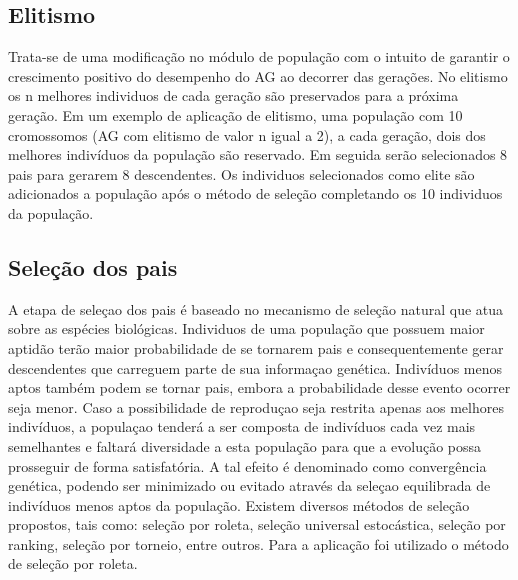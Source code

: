 \documentclass[twoside]{article}
\begin{document}
\begin{multicols}{2}
\subsection{Elitismo}
Trata-se de uma modificação no módulo de população com o intuito de garantir o crescimento positivo do desempenho do AG ao decorrer das gerações. No elitismo os n melhores individuos de cada geração são preservados para a próxima geração.  Em um exemplo de aplicação de elitismo, uma população com 10 cromossomos (AG com elitismo de valor n igual a 2), a cada geração, dois dos melhores indivíduos da população são reservado. Em seguida serão selecionados 8 pais para gerarem 8 descendentes. Os individuos selecionados como elite são adicionados a população após o método de seleção completando os 10 individuos da população.

\subsection{Seleção dos pais}
A etapa de seleçao dos pais é baseado no mecanismo de seleção natural que atua sobre as espécies biológicas. Individuos de uma população que possuem maior aptidão terão maior probabilidade de se tornarem pais e consequentemente gerar descendentes que carreguem parte de sua informaçao genética. Indivíduos menos aptos também podem se tornar pais, embora a probabilidade desse evento ocorrer seja menor. Caso a possibilidade de reproduçao seja restrita apenas aos melhores indivíduos, a populaçao tenderá a ser composta de indivíduos cada vez mais semelhantes e faltará diversidade a esta população para que a evolução possa prosseguir de forma satisfatória. A tal efeito é denominado como convergência genética, podendo ser minimizado ou evitado através da seleçao equilibrada de indivíduos menos aptos da população. Existem diversos métodos de seleção propostos, tais como: seleção por roleta, seleção universal estocástica, seleção por ranking, seleção por torneio, entre outros. Para a aplicação foi utilizado o método de seleção por roleta.


\end{multicols}
\end{document}
